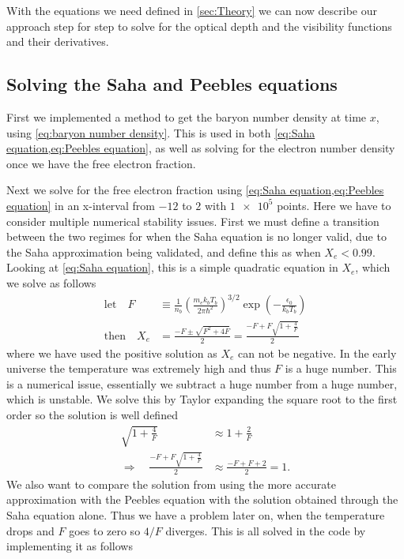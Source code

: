\documentclass[10pt,a4paper]{article}
\begin{document}
With the equations we need defined in \cref{sec:Theory} we can now describe our approach step for step to solve for the optical depth and the visibility functions and their derivatives.

\subsection{Solving the Saha and Peebles equations}
\label{subsec:Method/Solving Xe}
First we implemented a method to get the baryon number density at time $x$, using \cref{eq:baryon number density}. This is used in both \cref{eq:Saha equation,eq:Peebles equation}, as well as solving for the electron number density once we have the free electron fraction.

Next we solve for the free electron fraction using \cref{eq:Saha equation,eq:Peebles equation} in an x-interval from $-12$ to $2$ with $\num{1e5}$ points. Here we have to consider multiple numerical stability issues. First we must define a transition between the two regimes for when the Saha equation is no longer valid, due to the Saha approximation being validated, and define this as when $X_e < 0.99$. Looking at \cref{eq:Saha equation}, this is a simple quadratic equation in $X_e$, which we solve as follows
\begin{align*}
    \text{let} \quad  F &\equiv \frac{1}{n_b}\left(\frac{m_e k_b T_b}{2\pi \hbar^2}\right)^{3/2} \exp(-\frac{\epsilon_0}{k_b T_b})
    \\
    \text{then} \quad X_e &= \frac{-F \pm \sqrt{F^2 + 4F}}{2} = \frac{-F + F\sqrt{1+\frac{4}{F}}}{2}
\end{align*}
where we have used the positive solution as $X_e$ can not be negative. In the early universe the temperature was extremely high and thus $F$ is a huge number. This is a numerical issue, essentially we subtract a huge number from a huge number, which is unstable. We solve this by Taylor expanding the square root to the first order so the solution is well defined
\begin{align*}
    \sqrt{1+\frac{4}{F}} &\approx 1+ \frac{2}{F}
    \\
    \Rightarrow \quad \frac{-F + F\sqrt{1+\frac{4}{F}}}{2} &\approx \frac{-F + F +2}{2} = 1.
\end{align*}
We also want to compare the solution from using the more accurate approximation with the Peebles equation with the solution obtained through the Saha equation alone. Thus we have a problem later on, when the temperature drops and $F$ goes to zero so $4/F$ diverges. This is all solved in the code by implementing it as follows
\end{document}

